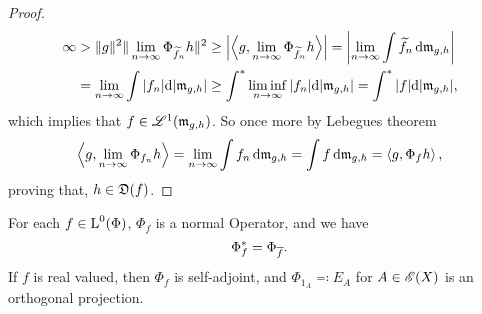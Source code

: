 \begin{proof}
 \begin{align*}
   \infty &> \|g\|^2 \| \lim_{n \to \infty} \Phi_{\widetilde{f}_n}h \|^2 \geq
   \left|\left\langle g, \lim_{n \to \infty} \Phi_{\widetilde{f}_n} h \right\rangle \right| =
   \left|\lim_{n \to \infty} \int \widetilde{f}_n \operatorname{d}\! \mathfrak{m}_{g,h} \right| \\
	  &= \lim_{n \to \infty} \int |f_n| \text{d}  |\mathfrak{m}_{g,h}| 
	  \geq \int ^{*} \liminf_{n \to \infty} |f_n| \text{d}  |\mathfrak{m}_{g,h}| 
	  = \int ^{*} |f| \text{d}  |\mathfrak{m}_{g,h}|,
 \end{align*}
 which implies that $f \in \mathscr{L}^1(\mathfrak{m}_{g,h})$. 
 So once more by Lebegues theorem
 \[
 \left\langle g, \lim_{n \to \infty} \Phi_{f_n} h  \right\rangle = 
 \lim_{n \to \infty} \int f_n \operatorname{d}\! \mathfrak{m}_{g,h} = \int f \operatorname{d}\! \mathfrak{m}_{g,h}
 =\left\langle g, \Phi_f h \right\rangle,
 \]
proving that, $h \in \mathfrak{D}(f)$. 


\end{proof}




\begin{lem}
  \label{maintheorem3}
 For each $f \in {\text{L}^0}(\Phi)$, $\Phi_f$ is a normal Operator, and we have
\[
\Phi_f ^{*} = \Phi_{\overline{f}}. 
\]
If $f$ is real valued, then $\Phi_f$ is self-adjoint, and $\Phi_{1_A} 
\eqqcolon E_A$ for $ A \in \mathscr{E}(X)$ is an orthogonal projection. 
\end{lem}


